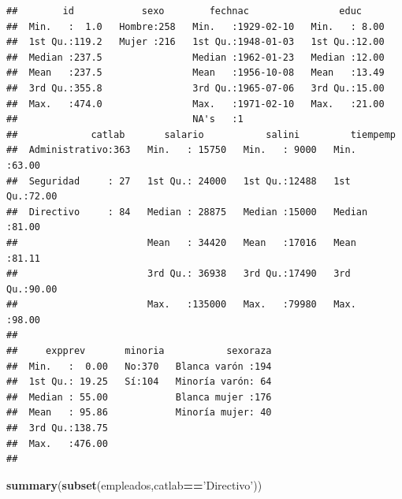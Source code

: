 \documentclass[]{book}
\newenvironment{Shaded}{\begin{snugshade}}{\end{snugshade}}
\newcommand{\KeywordTok}[1]{\textcolor[rgb]{0.13,0.29,0.53}{\textbf{#1}}}
\newcommand{\NormalTok}[1]{#1}
\newcommand{\OperatorTok}[1]{\textcolor[rgb]{0.81,0.36,0.00}{\textbf{#1}}}
\newcommand{\StringTok}[1]{\textcolor[rgb]{0.31,0.60,0.02}{#1}}
\begin{document}
\begin{verbatim}
##        id            sexo        fechnac                educ      
##  Min.   :  1.0   Hombre:258   Min.   :1929-02-10   Min.   : 8.00  
##  1st Qu.:119.2   Mujer :216   1st Qu.:1948-01-03   1st Qu.:12.00  
##  Median :237.5                Median :1962-01-23   Median :12.00  
##  Mean   :237.5                Mean   :1956-10-08   Mean   :13.49  
##  3rd Qu.:355.8                3rd Qu.:1965-07-06   3rd Qu.:15.00  
##  Max.   :474.0                Max.   :1971-02-10   Max.   :21.00  
##                               NA's   :1                           
##             catlab       salario           salini         tiempemp    
##  Administrativo:363   Min.   : 15750   Min.   : 9000   Min.   :63.00  
##  Seguridad     : 27   1st Qu.: 24000   1st Qu.:12488   1st Qu.:72.00  
##  Directivo     : 84   Median : 28875   Median :15000   Median :81.00  
##                       Mean   : 34420   Mean   :17016   Mean   :81.11  
##                       3rd Qu.: 36938   3rd Qu.:17490   3rd Qu.:90.00  
##                       Max.   :135000   Max.   :79980   Max.   :98.00  
##                                                                       
##     expprev       minoria           sexoraza  
##  Min.   :  0.00   No:370   Blanca varón :194  
##  1st Qu.: 19.25   Sí:104   Minoría varón: 64  
##  Median : 55.00            Blanca mujer :176  
##  Mean   : 95.86            Minoría mujer: 40  
##  3rd Qu.:138.75                               
##  Max.   :476.00                               
## 
\end{verbatim}

\begin{Shaded}
\begin{Highlighting}[]
\KeywordTok{summary}\NormalTok{(}\KeywordTok{subset}\NormalTok{(empleados,catlab}\OperatorTok{==}\StringTok{'Directivo'}\NormalTok{))}
\end{Highlighting}
\end{Shaded}
\end{document}
